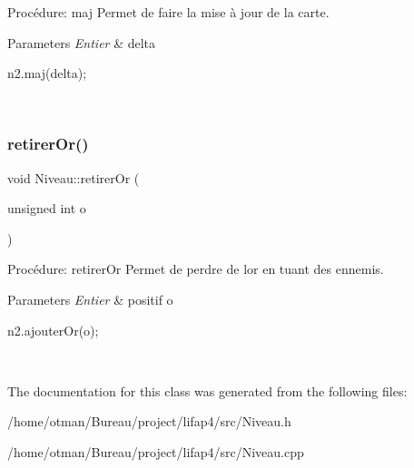 Procédure\+: maj Permet de faire la mise à jour de la carte. 


\begin{DoxyParams}{Parameters}
{\em Entier} & delta 
\begin{DoxyCode}
n2.maj(delta);
\end{DoxyCode}
 \\
\hline
\end{DoxyParams}
\mbox{\label{classNiveau_a3192b7514716cfddac9ff465f9ad1f2f}} 
\subsubsection{\texorpdfstring{retirer\+Or()}{retirerOr()}}
{\footnotesize\ttfamily void Niveau\+::retirer\+Or (\begin{DoxyParamCaption}\item[{unsigned int}]{o }\end{DoxyParamCaption})}



Procédure\+: retirer\+Or Permet de perdre de l\textquotesingle{}or en tuant des ennemis. 


\begin{DoxyParams}{Parameters}
{\em Entier} & positif o 
\begin{DoxyCode}
n2.ajouterOr(o);
\end{DoxyCode}
 \\
\hline
\end{DoxyParams}


The documentation for this class was generated from the following files\+:\begin{DoxyCompactItemize}
\item 
/home/otman/\+Bureau/project/lifap4/src/Niveau.\+h\item 
/home/otman/\+Bureau/project/lifap4/src/Niveau.\+cpp\end{DoxyCompactItemize}
